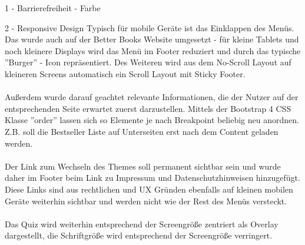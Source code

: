 \documentclass[a4paper]{article}
\begin{document}
\begin{exercise}{1 - Barrierefreiheit - Farbe}
\begin{center}
 \end{center}


\end{exercise}
\newpage
\begin{exercise}{2 - Responsive Design} 
Typisch für mobile Geräte ist das Einklappen des Menüs. Das wurde auch auf der Better Books Website umgesetzt - für kleine Tablets und noch kleinere Displays wird das Menü im Footer reduziert und durch das typische ''Burger'' - Icon repräsentiert. Des Weiteren wird aus dem No-Scroll Layout auf kleineren Screens automatisch ein Scroll Layout mit Sticky Footer.\\\\
Außerdem wurde darauf geachtet relevante Informationen, die der Nutzer auf der entsprechenden Seite erwartet zuerst darzustellen. Mittels der Bootstrap 4 CSS Klasse ''order'' lassen sich so Elemente je nach Breakpoint beliebig neu anordnen. Z.B. soll die Bestseller Liste auf Unterseiten erst nach dem Content geladen werden.\\\\
Der Link zum Wechseln des Themes soll permanent sichtbar sein und wurde daher im Footer beim Link zu Impressum und Datenschutzhinweisen hinzugefügt. Diese Links sind aus rechtlichen und UX Gründen ebenfalls auf kleinen mobilen Geräte weiterhin sichtbar und werden nicht wie der Rest des Menüs versteckt.\\\\
Das Quiz wird weiterhin entsprechend der Screengröße zentriert als Overlay dargestellt, die Schriftgröße wird entsprechend der Screengröße verringert.


\end{exercise}
\end{document}
